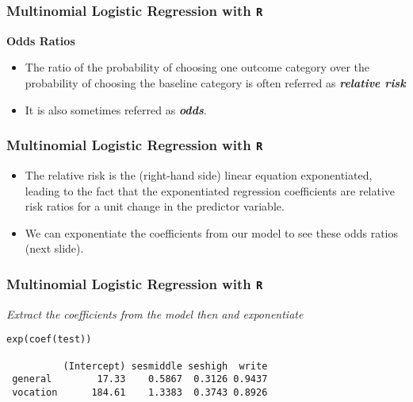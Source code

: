 \documentclass[00-GLMregslides.tex]{subfiles}
\begin{document}
	


\begin{frame}[fragile]

\frametitle{Multinomial Logistic Regression with \texttt{R}}
\Large
\textbf{Odds Ratios}
\begin{itemize}
\item The ratio of the probability of choosing one outcome category over the probability of choosing the baseline category is often referred as 
\textbf{\textit{relative risk}} 
\item It is also sometimes referred as \textbf{\textit{odds}}.

\end{itemize}
\end{frame}
\begin{frame}[fragile]
\frametitle{Multinomial Logistic Regression with \texttt{R}}	\Large
	\begin{itemize}
\item  The relative risk is the (right-hand side) linear equation exponentiated, leading to the fact that the 
exponentiated regression coefficients are relative risk ratios for a unit change in the predictor variable. 
\item  We can exponentiate the coefficients from our model to see these odds ratios (next slide). 
\end{itemize}
\end{frame}
\begin{frame}[fragile]

\frametitle{Multinomial Logistic Regression with \texttt{R}}
\large

\textit{Extract the coefficients from the model then and exponentiate}
\begin{framed}
\begin{verbatim}
exp(coef(test))
 
          (Intercept) sesmiddle seshigh  write
 general        17.33    0.5867  0.3126 0.9437
 vocation      184.61    1.3383  0.3743 0.8926
\end{verbatim}
\end{framed}
\end{frame}
\end{document}
